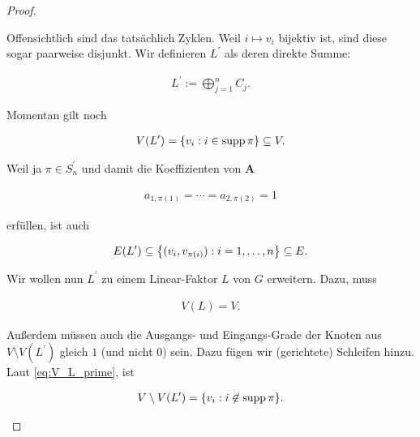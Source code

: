 \begin{proof}
\begin{enumerate}[label = \arabic*.]
                Offensichtlich sind das tatsächlich Zyklen.
                Weil $i \mapsto v_i$ bijektiv ist, sind diese sogar paarweise disjunkt.
                Wir definieren $L^\prime$ als deren direkte Summe:

                \begin{align*}
                    L^\prime
                    :=
                    \bigoplus_{j=1}^n C_j.
                \end{align*}

                Momentan gilt noch

                \begin{align} \label{eq:V_L_prime}
                    V(L^\prime)
                    =
                    {\left \{ v_i: i \in \operatorname{supp} \pi \right \}}
                    \subseteq
                    V.
                \end{align}

                Weil ja $\pi \in S_n^\prime$ und damit die Koeffizienten von $\mathbf A$

                \begin{align*}
                    a_{1, \pi(1)} = \cdots = a_{2, \pi(2)} = 1
                \end{align*}

                erfüllen, ist auch

                \begin{align} \label{eq:E_L_prime}
                    E(L^\prime)
                    \subseteq
                    {\left \{ (v_i, v_{\pi(i)}): i = 1, \dots, n \right \}}
                    \subseteq
                    E.
                \end{align}

                Wir wollen nun $L^\prime$ zu einem Linear-Faktor $L$ von $G$ erweitern.
                Dazu, muss

                \begin{align*}
                    V(L) = V.
                \end{align*}

                Außerdem müssen auch die Ausgangs- und Eingangs-Grade der Knoten aus $V \setminus V(L^\prime)$ gleich $1$ (und nicht $0$) sein.
                Dazu fügen wir (gerichtete) Schleifen hinzu.
                Laut \eqref{eq:V_L_prime}, ist

                \begin{align*}
                    V \setminus V(L^\prime)
                    =
                    {\left \{ v_i: i \not \in \operatorname{supp} \pi \right \}}.
                \end{align*}


\end{enumerate}
\end{proof}

